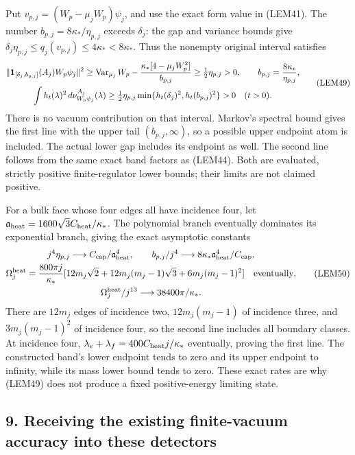 \documentclass[11pt]{article}
\begin{document}
Put \(v_{p,j}=(W_p-\mu_jW_p)\psi_j\), and use the exact form value in (LEM41). The number \(b_{p,j}=8\kappa_*/\eta_{p,j}\) exceeds \(\delta_j\): the gap and variance bounds give \(\delta_j\eta_{p,j}\le q_j(v_{p,j})\le4\kappa_*<8\kappa_*\). Thus the nonempty original interval satisfies
\[
\begin{gathered}
\|\mathbf1_{[\delta_j,b_{p,j}]}(A_j)W_p\psi_j\|^2
\ge\operatorname{Var}_{\mu_j}W_p
       -{\kappa_*[4-\mu_jW_p^2]\over b_{p,j}}
\ge\tfrac12\eta_{p,j}>0,\qquad b_{p,j}={8\kappa_*\over\eta_{p,j}},\\
\int h_t(\lambda)^2\,d\nu_{W_p\psi_j}^{A_j}(\lambda)
\ge\tfrac12\eta_{p,j}
\min\{h_t(\delta_j)^2,h_t(b_{p,j})^2\}>0
\quad(t>0).
\end{gathered}\tag{LEM49}
\]
There is no vacuum contribution on that interval. Markov's spectral bound gives the first line with the upper tail \((b_{p,j},\infty)\), so a possible upper endpoint atom is included. The actual lower gap includes its endpoint as well. The second line follows from the same exact band factors as (LEM44). Both are evaluated, strictly positive finite-regulator lower bounds; their limits are not claimed positive.

For a bulk face whose four edges all have incidence four, let
\(\mathfrak a_{\rm heat}=1600\sqrt3C_{\rm heat}/\kappa_*\). The polynomial branch eventually dominates its exponential branch, giving the exact asymptotic constants
\[
\begin{gathered}
j^4\eta_{p,j}\longrightarrow C_{\rm cap}/\mathfrak a_{\rm heat}^4,
\qquad b_{p,j}/j^4\longrightarrow
8\kappa_*\mathfrak a_{\rm heat}^4/C_{\rm cap},\\
\Omega_j^{\rm heat}={800\pi j\over\kappa_*}
[12m_j\sqrt2+12m_j(m_j-1)\sqrt3+6m_j(m_j-1)^2]
\quad\hbox{eventually},\\
\Omega_j^{\rm heat}/j^{13}\longrightarrow38400\pi/\kappa_*.
\end{gathered}\tag{LEM50}
\]
There are \(12m_j\) edges of incidence two, \(12m_j(m_j-1)\) of incidence three, and \(3m_j(m_j-1)^2\) of incidence four, so the second line includes all boundary classes. At incidence four, \(\lambda_e+\lambda_f=400C_{\rm heat}j/\kappa_*\) eventually, proving the first line. The constructed band's lower endpoint tends to zero and its upper endpoint to infinity, while its mass lower bound tends to zero. These exact rates are why (LEM49) does not produce a fixed positive-energy limiting state.

\subsection*{9. Receiving the existing finite-vacuum accuracy into these detectors}
\end{document}

